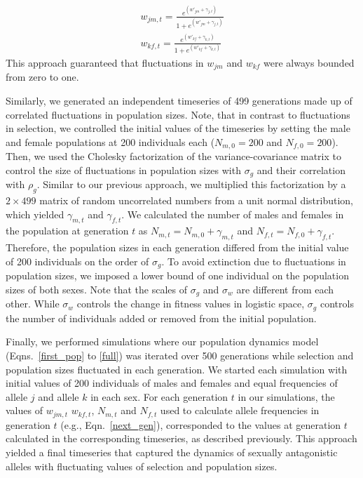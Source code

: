\documentclass[12pt]{article}
\begin{document}
\begin{eqnarray}
  w_{jm,t}= \frac{e^{(w'_{jm}+ \gamma_{j,t})}}{1+ e^{(w'_{jm}+ \gamma_{j,t})}} \\
    w_{kf,t}= \frac{e^{(w'_{kf}+ \gamma_{k,t})}}{1+ e^{(w'_{kf}+ \gamma_{k,t})}}
    \label{logistic_w}
\end{eqnarray}
This approach guaranteed that fluctuations in $w_{jm}$ and $w_{kf}$ were always bounded from zero to one.

Similarly, we generated an independent timeseries of 499 generations made up of correlated fluctuations in population sizes. Note, that in contrast to fluctuations in selection, we controlled the initial values of the timeseries by setting the male and female populations at 200 individuals each ($N_{m,0} =200$ and $N_{f,0} =200$). Then, we used the Cholesky factorization of the variance-covariance matrix to control the size of fluctuations in population sizes with $\sigma_{g}$ and their correlation with $\rho_{g}$. Similar to our previous approach, we multiplied this factorization by a $2 \times 499$ matrix of random uncorrelated numbers from a unit normal distribution, which yielded $\gamma_{m,t}$ and $\gamma_{f,t}$. We calculated the number of males and females in the population at generation $t$ as $N_{m,t} = N_{m,0} + \gamma_{m,t}$ and $N_{f,t} = N_{f,0}+ \gamma_{f,t} $. Therefore, the population sizes in each generation differed from the initial value of 200 individuals on the order of $\sigma_{g}$. To avoid extinction due to fluctuations in population sizes, we imposed a lower bound of one individual on the population sizes of both sexes. Note that the scales of $\sigma_{g}$ and  $\sigma_{w}$ are different from each other. While $\sigma_{w}$ controls the change in fitness values in logistic space, $\sigma_{g}$ controls the number of individuals added or removed from the initial population.



Finally, we performed simulations where our population dynamics model (Eqns.~\ref{first_pop} to \ref{full}) was iterated over 500 generations while selection and population sizes fluctuated in each generation. We started each simulation with initial values of 200 individuals of males and females and equal frequencies of allele $j$ and allele $k$ in each sex. For each generation $t$ in our simulations, the values of $w_{jm,t}$ $w_{kf,t}$, $N_{m,t}$ and $N_{f,t}$ used to calculate allele frequencies in generation $t$ (e.g., Eqn.~\ref{next_gen}), corresponded to the values at generation $t$ calculated in the corresponding timeseries, as described previously. This approach yielded a final timeseries that captured the dynamics of sexually antagonistic alleles with fluctuating values of selection and population sizes.
\end{document}

